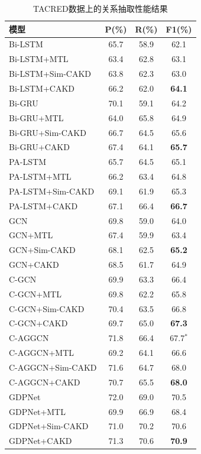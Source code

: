 \begin{table}[htp]
    \centering
    \caption{TACRED数据上的关系抽取性能结果}
	\begin{tabular}{lccc}
		\toprule
		模型 & P(\%) & R(\%) & F1(\%)  \\
		\midrule
		Bi-LSTM            & 65.7  & 58.9  & 62.1      \\
		Bi-LSTM+MTL            & 63.4  & 62.8  & 63.1       \\
        Bi-LSTM+Sim-CAKD            & 63.8  & 62.3  & 63.0    \\
		Bi-LSTM+CAKD   & 66.2  & 62.0  & \textbf{64.1}      \\
		\midrule
	    Bi-GRU            & 70.1 & 59.1  & 64.2      \\
		Bi-GRU+MTL     &  64.0 & 65.8  &  64.9       \\
		Bi-GRU+Sim-CAKD   &  66.7 & 64.5  &  65.6     \\
        Bi-GRU+CAKD   & 67.4 & 64.1  & \textbf{65.7}      \\
		\midrule
		PA-LSTM   & 65.7  & 64.5  & 65.1      \\
		PA-LSTM+MTL            & 66.2  & 63.4  & 64.8      \\
        PA-LSTM+Sim-CAKD            & 69.1  & 61.9  & 65.3        \\
		PA-LSTM+CAKD            & 67.1  & 66.4  & \textbf{66.7}     \\
		\midrule
		GCN            & 69.8  & 59.0  & 64.0      \\
		GCN+MTL            & 67.4  & 59.9  & 63.4      \\
		GCN+Sim-CAKD            & 68.1  & 62.5  & \textbf{65.2}        \\
        GCN+CAKD           & 68.5  & 61.7  & 64.9      \\
        \midrule
		C-GCN            & 69.9  & 63.3  & 66.4      \\
		C-GCN+MTL            & 69.8  & 62.2  & 65.8      \\
		C-GCN+Sim-CAKD            & 70.4  & 63.5  & 66.8        \\
        C-GCN+CAKD           & 69.7  & 65.0  & \textbf{67.3}      \\
        \midrule
		C-AGGCN            & 71.8  & 66.4  & 67.7$^*$      \\
		C-AGGCN+MTL            & 69.2  & 64.1  & 66.6      \\
		C-AGGCN+Sim-CAKD            & 71.6  & 64.7  & 68.0        \\
        C-AGGCN+CAKD           & 70.7  & 65.5  & \textbf{68.0}        \\
        \midrule
		GDPNet            & 72.0  & 69.0  & 70.5      \\
		GDPNet+MTL            & 69.9  & 66.9  & 68.4      \\
		GDPNet+Sim-CAKD            & 71.0  & 70.2  & 70.6        \\
        GDPNet+CAKD           & 71.3  & 70.6  & \textbf{70.9}        \\
		\bottomrule
	\end{tabular}
	\label{relation_results}
\end{table}

